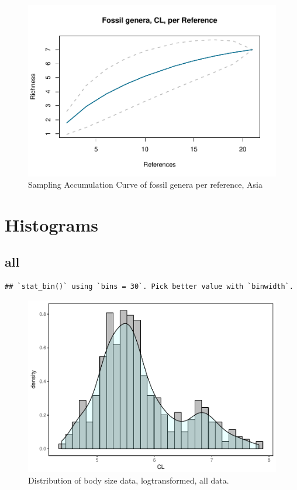 \documentclass[]{article}
\begin{document}
\begin{figure}[htbp]
\centering
\includegraphics{MA_JJ_files/figure-latex/Species Accumulation Curve with Genera, Asia-1.pdf}
\caption{Sampling Accumulation Curve of fossil genera per reference,
Asia}
\end{figure}

\newpage

\section{Histograms}\label{histograms}

\subsection{all}\label{all}

\begin{verbatim}
## `stat_bin()` using `bins = 30`. Pick better value with `binwidth`.
\end{verbatim}

\begin{figure}[htbp]
\centering
\includegraphics{MA_JJ_files/figure-latex/Histograms of body size data, all-1.pdf}
\caption{Distribution of body size data, logtransformed, all data.}
\end{figure}
\end{document}

